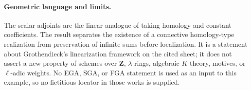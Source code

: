 \paragraph{Geometric language and limits.}
The scalar adjoints are the linear analogue of taking homology and
constant coefficients.  The result separates the existence of a
connective homology-type realization from preservation of infinite
sums before localization.  It is a statement about Grothendieck's
linearization framework on the cited sheet; it does not assert a new
property of schemes over $\mathbf Z$, $\lambda$-rings, algebraic
$K$-theory, motives, or $\ell$-adic weights.  No EGA, SGA, or FGA
statement is used as an input to this example, so no fictitious
locator in those works is supplied.
